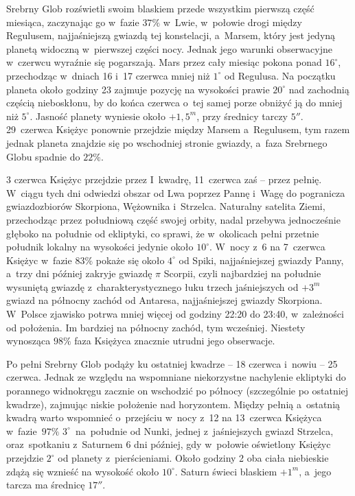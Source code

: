 {\begin{dwieszpalty}
Srebrny Glob rozświetli swoim blaskiem przede wszystkim pierwszą część miesiąca, zaczynając go w~fazie $37\%$ w~Lwie, w~połowie drogi między Regulusem, najjaśniejszą gwiazdą tej konstelacji, a~Marsem, który jest jedyną planetą widoczną w~pierwszej części nocy. Jednak jego warunki obserwacyjne w~czerwcu wyraźnie się pogarszają. Mars przez cały miesiąc pokona ponad $16^{\circ}$, przechodząc w~dniach 16 i~17 czerwca mniej niż $1^{\circ}$ od Regulusa. Na początku planeta około godziny 23 zajmuje pozycję na wysokości prawie $20^{\circ}$ nad zachodnią częścią nieboskłonu, by do końca czerwca o~tej samej porze obniżyć ją do mniej niż $5^{\circ}$. Jasność planety wyniesie około $+1,5^m$, przy średnicy tarczy $5''$. 29~czerwca Księżyc ponownie przejdzie między Marsem a~Regulusem, tym razem jednak planeta znajdzie się po wschodniej stronie gwiazdy, a~faza Srebrnego Globu spadnie do $22\%$.

3 czerwca Księżyc przejdzie przez I~kwadrę, 11~czerwca zaś -- przez pełnię. W~ciągu tych dni odwiedzi obszar od Lwa poprzez Pannę i~Wagę do pogranicza gwiazdozbiorów Skorpiona, Wężownika i~Strzelca. Naturalny satelita Ziemi, przechodząc przez południową część swojej orbity, nadal przebywa jednocześnie głęboko na południe od ekliptyki, co sprawi, że w~okolicach pełni przetnie południk lokalny na wysokości jedynie około $10^{\circ}$. W~nocy z~6 na 7~czerwca Księżyc w~fazie $83\%$ pokaże się około $4^{\circ}$ od Spiki, najjaśniejszej gwiazdy Panny, a~trzy dni później zakryje gwiazdę $\pi$ Scorpii, czyli najbardziej na południe wysuniętą gwiazdę z~charakterystycznego łuku trzech jaśniejszych od $+3^m$ gwiazd na północny zachód od Antaresa, najjaśniejszej gwiazdy Skorpiona. W~Polsce zjawisko potrwa mniej więcej od godziny 22:20 do 23:40, w~zależności od położenia. Im bardziej na północny zachód, tym wcześniej. Niestety wynosząca $98\%$ faza Księżyca znacznie utrudni jego obserwacje.

Po pełni Srebrny Glob podąży ku ostatniej kwadrze -- 18 czerwca i~nowiu -- 25 czerwca. Jednak ze względu na wspomniane niekorzystne nachylenie ekliptyki do porannego widnokręgu zacznie on wschodzić po północy (szczególnie po ostatniej kwadrze), zajmując niskie położenie nad horyzontem. Między pełnią a~ostatnią kwadrą warto wspomnieć o~przejściu w~nocy z~12 na 13~czerwca Księżyca w~fazie~$97\%$ $3^{\circ}$~na~południe od Nunki, jednej z~jaśniejszych gwiazd Strzelca, oraz~spotkaniu z~Saturnem 6 dni później, gdy w~połowie oświetlony Księżyc przejdzie $2^{\circ}$ od planety z~pierścieniami. Około godziny 2 oba ciała niebieskie zdążą się wznieść na wysokość około $10^{\circ}$. Saturn świeci blaskiem $+1^m$, a~jego tarcza ma średnicę $17''$.


\end{dwieszpalty}}
